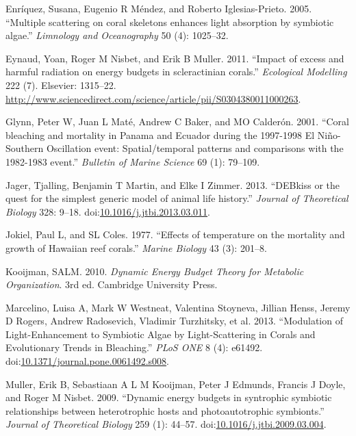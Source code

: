 \documentclass[]{elsarticle} %
\begin{document}
\hypertarget{ref-Enriquez:2005p142}{}
Enríquez, Susana, Eugenio R Méndez, and Roberto Iglesias-Prieto. 2005.
``Multiple scattering on coral skeletons enhances light absorption by
symbiotic algae.'' \emph{Limnology and Oceanography} 50 (4): 1025--32.

\hypertarget{ref-Eynaud:2011tv}{}
Eynaud, Yoan, Roger M Nisbet, and Erik B Muller. 2011. ``Impact of
excess and harmful radiation on energy budgets in scleractinian
corals.'' \emph{Ecological Modelling} 222 (7). Elsevier: 1315--22.
\url{http://www.sciencedirect.com/science/article/pii/S0304380011000263}.

\hypertarget{ref-Glynn:2001p7571}{}
Glynn, Peter W, Juan L Maté, Andrew C Baker, and MO Calderón. 2001.
``Coral bleaching and mortality in Panama and Ecuador during the
1997-1998 El Niño-Southern Oscillation event: Spatial/temporal patterns
and comparisons with the 1982-1983 event.'' \emph{Bulletin of Marine
Science} 69 (1): 79--109.

\hypertarget{ref-Jager:2013bj}{}
Jager, Tjalling, Benjamin T Martin, and Elke I Zimmer. 2013. ``DEBkiss
or the quest for the simplest generic model of animal life history.''
\emph{Journal of Theoretical Biology} 328: 9--18.
doi:\href{https://doi.org/10.1016/j.jtbi.2013.03.011}{10.1016/j.jtbi.2013.03.011}.

\hypertarget{ref-Jokiel:1977p7353}{}
Jokiel, Paul L, and SL Coles. 1977. ``Effects of temperature on the
mortality and growth of Hawaiian reef corals.'' \emph{Marine Biology} 43
(3): 201--8.

\hypertarget{ref-Kooijman:2010vd}{}
Kooijman, SALM. 2010. \emph{Dynamic Energy Budget Theory for Metabolic
Organization}. 3rd ed. Cambridge University Press.

\hypertarget{ref-Marcelino:2013hz}{}
Marcelino, Luisa A, Mark W Westneat, Valentina Stoyneva, Jillian Henss,
Jeremy D Rogers, Andrew Radosevich, Vladimir Turzhitsky, et al. 2013.
``Modulation of Light-Enhancement to Symbiotic Algae by Light-Scattering
in Corals and Evolutionary Trends in Bleaching.'' \emph{PLoS ONE} 8 (4):
e61492.
doi:\href{https://doi.org/10.1371/journal.pone.0061492.s008}{10.1371/journal.pone.0061492.s008}.

\hypertarget{ref-Muller:2009io}{}
Muller, Erik B, Sebastiaan A L M Kooijman, Peter J Edmunds, Francis J
Doyle, and Roger M Nisbet. 2009. ``Dynamic energy budgets in syntrophic
symbiotic relationships between heterotrophic hosts and photoautotrophic
symbionts.'' \emph{Journal of Theoretical Biology} 259 (1): 44--57.
doi:\href{https://doi.org/10.1016/j.jtbi.2009.03.004}{10.1016/j.jtbi.2009.03.004}.
\end{document}
